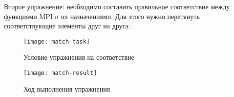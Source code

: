 \documentclass[a4paper,14pt]{extarticle}
\begin{document}
Второе упражнение: необходимо составить правильное соответствие между функциями
MPI и их назначениями. Для этого нужно перетянуть соответствующие элементы друг
на друга:

\begin{figure}[H]
    \centering
    \texttt{[image: match-task]}
    \caption{Условие упражнения на соответствие}
    \label{fig:match-task}
\end{figure}

\begin{figure}[H]
    \centering
    \texttt{[image: match-result]}
    \caption{Ход выполнения упражнения}
    \label{fig:match-result}
\end{figure}
\end{document}
